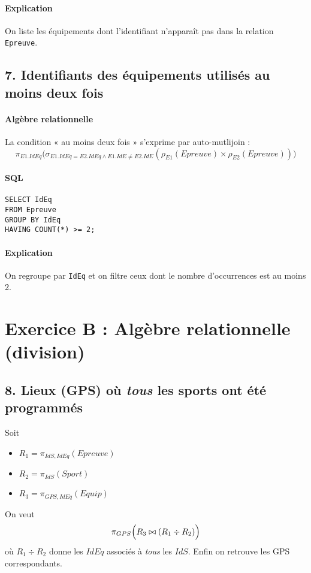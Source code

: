 \documentclass[a4paper,12pt]{article}
\begin{document}
\paragraph{Explication}
On liste les équipements dont l'identifiant n'apparaît pas dans la relation \texttt{Epreuve}.

\subsection*{7. Identifiants des équipements utilisés au moins deux fois}
\paragraph{Algèbre relationnelle}

La condition « au moins deux fois » s'exprime par auto-mutlijoin :
\[
  \pi_{E1.IdEq}\bigl(\sigma_{E1.IdEq = E2.IdEq \wedge E1.IdE \neq E2.IdE}(\rho_{E1}(Epreuve) \times \rho_{E2}(Epreuve))\bigr)
\]
\paragraph{SQL}
\begin{verbatim}
SELECT IdEq
FROM Epreuve
GROUP BY IdEq
HAVING COUNT(*) >= 2;
\end{verbatim}
\paragraph{Explication}
On regroupe par \texttt{IdEq} et on filtre ceux dont le nombre d'occurrences est au moins \num{2}.

\section*{Exercice B : Algèbre relationnelle (division)}

\subsection*{8. Lieux (GPS) où \emph{tous} les sports ont été programmés}
Soit
\begin{itemize}
  \item $R_1 = \pi_{IdS,IdEq}(Epreuve)$
  \item $R_2 = \pi_{IdS}(Sport)$
  \item $R_3 = \pi_{GPS,IdEq}(Equip)$
\end{itemize}
On veut
\[
  \pi_{GPS} \Bigl(R_3 \bowtie (R_1 \div R_2)\Bigr)
\]
où $R_1 \div R_2$ donne les $IdEq$ associés à \emph{tous} les $IdS$. Enfin on retrouve les GPS correspondants.
\end{document}
